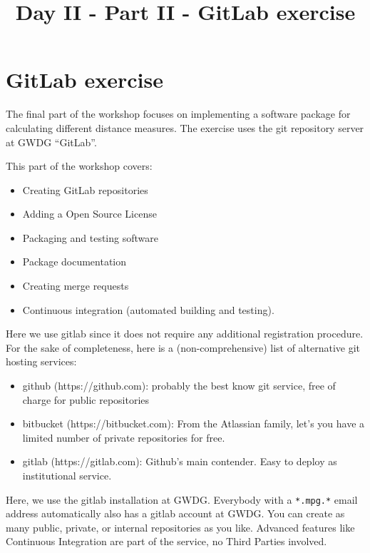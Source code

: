 \documentclass[11pt]{article}
\title{Day II - Part II - GitLab exercise}
\providecommand{\tightlist}{%
      \setlength{\itemsep}{0pt}\setlength{\parskip}{0pt}}
\begin{document}
    
    \maketitle
    
    

    
    \hypertarget{gitlab-exercise}{%
\section{GitLab exercise}\label{gitlab-exercise}}

The final part of the workshop focuses on implementing a software
package for calculating different distance measures. The exercise uses
the git repository server at GWDG ``GitLab''.

This part of the workshop covers:

\begin{itemize}
\tightlist
\item
  Creating GitLab repositories
\item
  Adding a Open Source License
\item
  Packaging and testing software
\item
  Package documentation
\item
  Creating merge requests
\item
  Continuous integration (automated building and testing).
\end{itemize}

    Here we use gitlab since it does not require any additional registration
procedure. For the sake of completeness, here is a (non-comprehensive)
list of alternative git hosting services:

\begin{itemize}
\tightlist
\item
  github (https://github.com): probably the best know git service, free
  of charge for public repositories
\item
  bitbucket (https://bitbucket.com): From the Atlassian family, let's
  you have a limited number of private repositories for free.
\item
  gitlab (https://gitlab.com): Github's main contender. Easy to deploy
  as institutional service.
\end{itemize}

Here, we use the gitlab installation at GWDG. Everybody with a
\texttt{*.mpg.*} email address automatically also has a gitlab account
at GWDG. You can create as many public, private, or internal
repositories as you like. Advanced features like Continuous Integration
are part of the service, no Third Parties involved.
\end{document}
